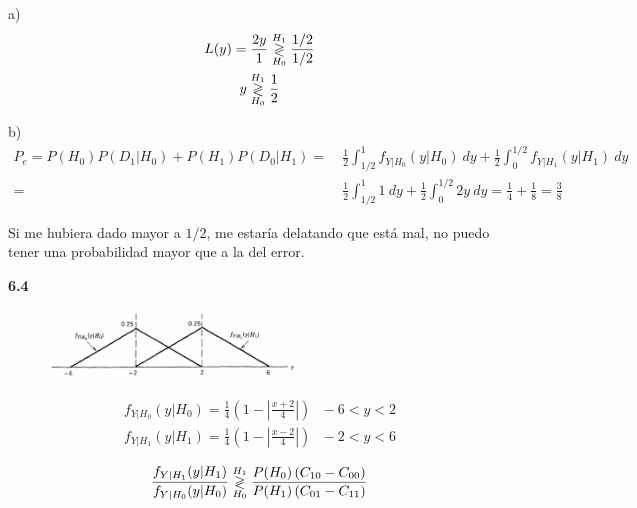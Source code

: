 a)
\begin{equation*}
\begin{gathered}
	L(y) = \frac{2y}{1} \overset{H_1}{\underset{H_0}{\gtrless}} \frac{1/2}{1/2}	\\
	y \overset{H_1}{\underset{H_0}{\gtrless}} \frac{1}{2}
\end{gathered}
\end{equation*}

b)
\begin{equation*}
\begin{split}
	P_e = P(H_0)P(D_1|H_0) + P(H_1)P(D_0|H_1) = \ & \frac{1}{2} \int_{1/2}^{1} f_{Y|H_0}(y|H_0) \ dy + \frac{1}{2} \int_{0}^{1/2} f_{Y|H_1}(y|H_1) \ dy \\
	 = \ & \frac{1}{2} \int_{1/2}^{1} 1 \ dy + \frac{1}{2} \int_{0}^{1/2} 2y \ dy = \frac{1}{4} + \frac{1}{8} = \frac{3}{8}
\end{split}
\end{equation*}

Si me hubiera dado mayor a $1/2$, me estaría delatando que está mal, no puedo tener una probabilidad mayor que a la del error.

\vspace{1cm}

\textbf{6.4}

\begin{figure}[H]
\centering
	\includegraphics[width=0.6\textwidth]{Imagenes/enbessel1.png}
\end{figure}
\begin{equation*}
\begin{gathered}
	f_{Y|H_0}(y|H_0) = \frac{1}{4} \left( 1 - \left| \frac{x + 2}{4} \right| \right) \ \ \ -6 < y < 2 \\
	f_{Y|H_1}(y|H_1) = \frac{1}{4} \left( 1 - \left| \frac{x - 2}{4} \right| \right) \ \ \ -2 < y < 6
\end{gathered}
\end{equation*}


\begin{equation*}
\begin{gathered}
	\frac{f_{Y|H_1}(y|H_1)}{f_{Y|H_0}(y|H_0)} \overset{H_1}{\underset{H_0}{\gtrless}} \frac{P(H_0) \left( C_{10} - C_{00} \right)}{P(H_1) \left( C_{01} - C_{11} \right)}
\end{gathered}
\end{equation*}

